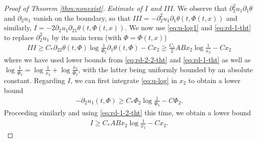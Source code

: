 \documentclass[10pt]{amsart}
\theoremstyle{definition}
\theoremstyle{remark}
\numberwithin{equation}{section}
\newcommand{\rd}{\partial}
\newcommand{\0}{\emptyset}
\newcommand{\tht}{\theta}
\begin{document}
\begin{proof}[Proof of Theorem \ref{thm:nonexist}]
			
			\medskip 
			
			\noindent \textit{Estimate of $I$ and $III$.} We observe that $\rd_{2}^{2} u_{1} \rd_{1}\tht$ and $\rd_{2} u_{1}$ vanish on the boundary, so that $III = -\rd_{2}^{2} u_{1} \rd_{1}\tht (t,\Phi(t,x))$ and similarly, $I = - 2\rd_2 u_1 \rd_{21}\tht (t,\Phi(t,x))$. We now use \eqref{eq:u-log1} and \eqref{eq:rd-1-tht} to replace $\rd_2^2 u_1$ by its main term (with $\Phi = \Phi(t,x)$) \begin{equation*}
				\begin{split}
					III \ge C_* \rd_{22}\tht(t,\Phi) \log \frac{1}{\Phi_{2}} \rd_{1}\tht(t,\Phi) - Cx_{2} \ge \frac{C_*}{2} A B x_{2} \log \frac{1}{x_2} - C x_{2}  
				\end{split}
			\end{equation*} where we have used lower bounds from \eqref{eq:rd-2-2-tht} and \eqref{eq:rd-1-tht} as well as $\log \frac{1}{\Phi_{2}}  = \log \frac{1}{x_{2}} + \log \frac{x_2}{\Phi_{2}} $, with the latter being uniformly bounded by an absolute constant. Regarding $I$, we can first integrate \eqref{eq:u-log} in $x_{2}$ to obtain a lower bound \begin{equation*}
				\begin{split}
					-\rd_{2} u_{1}(t,\Phi) \ge C_* \Phi_2  \log \frac{1}{\Phi_{2}} - C\Phi_2. 
				\end{split}
			\end{equation*} Proceeding similarly and using \eqref{eq:rd-1-2-tht} this time, we obtain a lower bound \begin{equation*}
				\begin{split}
					I \ge {C_*} A B x_{2} \log \frac{1}{x_2} - C x_{2}.
				\end{split}
			\end{equation*} 
			
			
			\medskip 
			

\end{proof}
\end{document}
